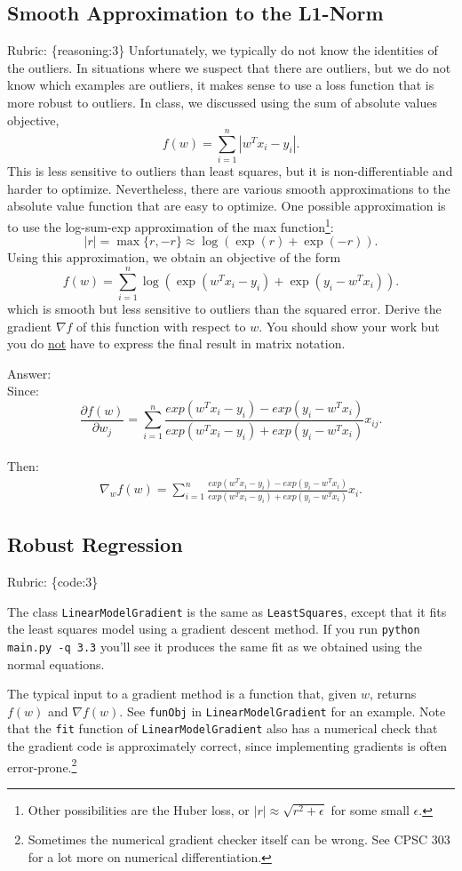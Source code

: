 \documentclass{article}
\def\rubric#1{\gre{Rubric: \{#1\}}}{}
\def\ans#1{\par\gre{Answer: #1}}
\def\blu#1{{\color{blu}#1}}
\def\gre#1{{\color{gre}#1}}
\begin{document}
\subsection{Smooth Approximation to the L1-Norm}
\rubric{reasoning:3}
Unfortunately, we typically do not know the identities of the outliers. In situations where we suspect that there are outliers, but we do not know which examples are outliers, it makes sense to use a loss function that is more robust to outliers. In class, we discussed using the sum of absolute values objective,
\[
f(w) = \sum_{i=1}^n |w^Tx_i - y_i|.
\]
This is less sensitive to outliers than least squares, but it is non-differentiable and harder to optimize. Nevertheless, there are various smooth approximations to the absolute value function that are easy to optimize. One possible approximation is to use the log-sum-exp approximation of the max function\footnote{Other possibilities are the Huber loss, or $|r|\approx \sqrt{r^2+\epsilon}$ for some small $\epsilon$.}:
\[
|r| = \max\{r, -r\} \approx \log(\exp(r) + \exp(-r)).
\]
Using this approximation, we obtain an objective of the form
\[
f(w) {=} \sum_{i=1}^n  \log\left(\exp(w^Tx_i - y_i) + \exp(y_i - w^Tx_i)\right).
\]
which is smooth but less sensitive to outliers than the squared error. \blu{Derive
 the gradient $\nabla f$ of this function with respect to $w$. You should show your work but you do \underline{not} have to express the final result in matrix notation.}
\ans{\\Since:
	\[\frac{\partial f(w)}{\partial w_j}=\sum_{i=1}^n \frac{exp(w^Tx_i-y_i)-exp(y_i-w^Tx_i)}{exp(w^Tx_i-y_i)+exp(y_i-w^Tx_i)} x_{ij}.\]\\
	Then:
	\begin{align*}
	\nabla_wf(w)=\sum_{i=1}^n \frac{exp(w^Tx_i-y_i)-exp(y_i-w^Tx_i)}{exp(w^Tx_i-y_i)+exp(y_i-w^Tx_i)}x_i.
	\end{align*}
}

\subsection{Robust Regression}
\rubric{code:3}

The class \texttt{LinearModelGradient} is the same as \texttt{LeastSquares}, except that it fits the least squares model using a gradient descent method. If you run \verb|python main.py -q 3.3| you'll see it produces the same fit as we obtained using the normal equations.

The typical input to a gradient method is a function that, given $w$, returns $f(w)$ and $\nabla f(w)$. See \texttt{funObj} in \texttt{LinearModelGradient} for an example. Note that the \texttt{fit} function of \texttt{LinearModelGradient} also has a numerical check that the gradient code is approximately correct, since implementing gradients is often error-prone.\footnote{Sometimes the numerical gradient checker itself can be wrong. See CPSC 303 for a lot more on numerical differentiation.}
\end{document}
